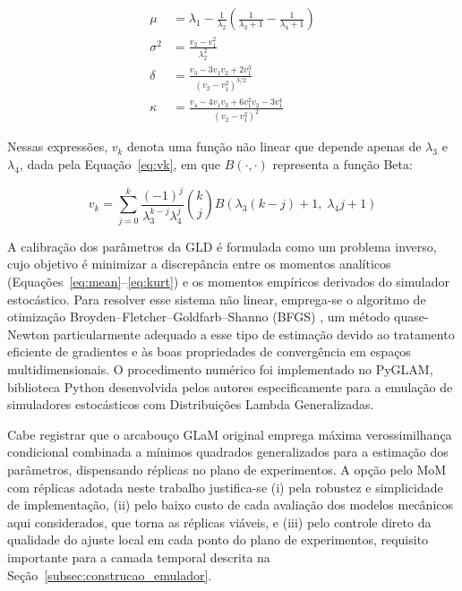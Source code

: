 \begin{align}
\mu &= \lambda_1 - \frac{1}{\lambda_2} \left( \frac{1}{\lambda_3 + 1} - \frac{1}{\lambda_4 + 1} \right) \label{eq:mean} \\
\sigma^2 &= \frac{v_2 - v_1^2}{\lambda_2^2} \label{eq:var} \\
\delta &= \frac{v_3 - 3v_1v_2 + 2v_1^3}{(v_2 - v_1^2)^{3/2}} \label{eq:skew} \\
\kappa &= \frac{v_4 - 4v_1v_3 + 6v_1^2v_2 - 3v_1^4}{(v_2 - v_1^2)^2} \label{eq:kurt}
\end{align}

Nessas expressões, $v_k$ denota uma função não linear que depende apenas de $\lambda_3$ e $\lambda_4$, dada pela Equação~\eqref{eq:vk}, em que $B(\cdot, \cdot)$ representa a função Beta:

\begin{equation}
v_k = \sum_{j=0}^{k} \frac{(-1)^j}{\lambda_3^{k-j} \lambda_4^j} \binom{k}{j} B\!\left(\lambda_3(k-j) + 1,\; \lambda_4 j + 1\right) \label{eq:vk}
\end{equation}

A calibração dos parâmetros da GLD é formulada como um problema inverso, cujo objetivo é minimizar a discrepância entre os momentos analíticos (Equações~\ref{eq:mean}--\ref{eq:kurt}) e os momentos empíricos derivados do simulador estocástico. Para resolver esse sistema não linear, emprega-se o algoritmo de otimização Broyden--Fletcher--Goldfarb--Shanno (BFGS) \parencite{nocedal2006}, um método quase-Newton particularmente adequado a esse tipo de estimação devido ao tratamento eficiente de gradientes e às boas propriedades de convergência em espaços multidimensionais. O procedimento numérico foi implementado no PyGLAM, biblioteca Python desenvolvida pelos autores especificamente para a emulação de simuladores estocásticos com Distribuições Lambda Generalizadas.

Cabe registrar que o arcabouço GLaM original \parencite{ZhuSudret2021} emprega máxima verossimilhança condicional combinada a mínimos quadrados generalizados para a estimação dos parâmetros, dispensando réplicas no plano de experimentos. A opção pelo MoM com réplicas adotada neste trabalho justifica-se (i) pela robustez e simplicidade de implementação, (ii) pelo baixo custo de cada avaliação dos modelos mecânicos aqui considerados, que torna as réplicas viáveis, e (iii) pelo controle direto da qualidade do ajuste local em cada ponto do plano de experimentos, requisito importante para a camada temporal descrita na Seção~\ref{subsec:construcao_emulador}.

